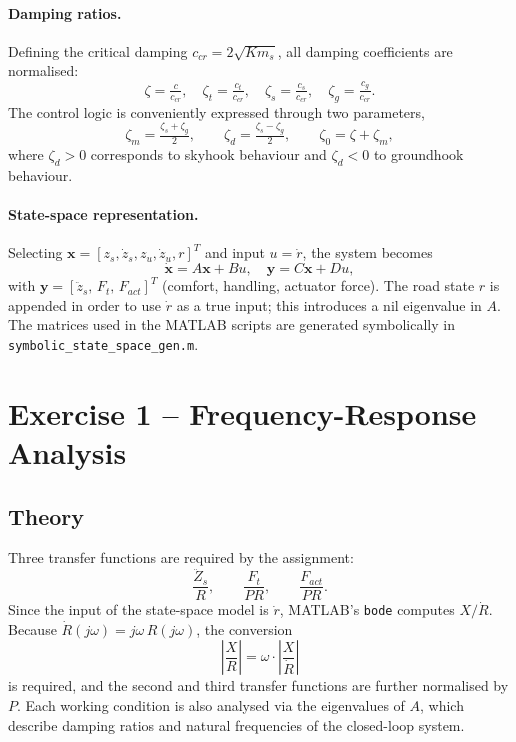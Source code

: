 \paragraph{Damping ratios.}
Defining the critical damping
$c_{cr} = 2\sqrt{K m_s}$, all damping coefficients are normalised:
\begin{equation}
    \zeta   = \tfrac{c}{c_{cr}}, \quad
    \zeta_t = \tfrac{c_t}{c_{cr}}, \quad
    \zeta_s = \tfrac{c_s}{c_{cr}}, \quad
    \zeta_g = \tfrac{c_g}{c_{cr}} .
\end{equation}
The control logic is conveniently expressed through two parameters,
\begin{equation}
    \zeta_m = \tfrac{\zeta_s + \zeta_g}{2}, \qquad
    \zeta_d = \tfrac{\zeta_s - \zeta_g}{2}, \qquad
    \zeta_0 = \zeta + \zeta_m ,
\end{equation}
where $\zeta_d > 0$ corresponds to skyhook behaviour and
$\zeta_d < 0$ to groundhook behaviour.

\paragraph{State-space representation.}
Selecting $\mathbf{x} = [z_s, \dot z_s, z_u, \dot z_u, r]^{T}$ and
input $u = \dot r$, the system becomes
\begin{equation}
    \dot{\mathbf{x}} = A\mathbf{x} + B u, \quad
    \mathbf{y} = C\mathbf{x} + D u,
\end{equation}
with $\mathbf{y} = [\ddot z_s,\, F_t,\, F_{act}]^{T}$
(comfort, handling, actuator force). The road state $r$ is appended
in order to use $\dot r$ as a true input; this introduces a nil
eigenvalue in $A$. The matrices used in the MATLAB scripts are
generated symbolically in \texttt{symbolic\_state\_space\_gen.m}.

\section{Exercise 1 -- Frequency-Response Analysis}

\subsection{Theory}
Three transfer functions are required by the assignment:
\begin{equation}
    \frac{\ddot Z_s}{R}, \qquad
    \frac{F_t}{P R}, \qquad
    \frac{F_{act}}{P R} .
\end{equation}
Since the input of the state-space model is $\dot r$, MATLAB's
\texttt{bode} computes $X/\dot R$. Because $\dot R(j\omega) =
j\omega\,R(j\omega)$, the conversion
\begin{equation}
    \left|\frac{X}{R}\right| = \omega \cdot \left|\frac{X}{\dot R}\right|
\end{equation}
is required, and the second and third transfer functions are further
normalised by $P$. Each working condition is also analysed via the
eigenvalues of $A$, which describe damping ratios and natural
frequencies of the closed-loop system.

